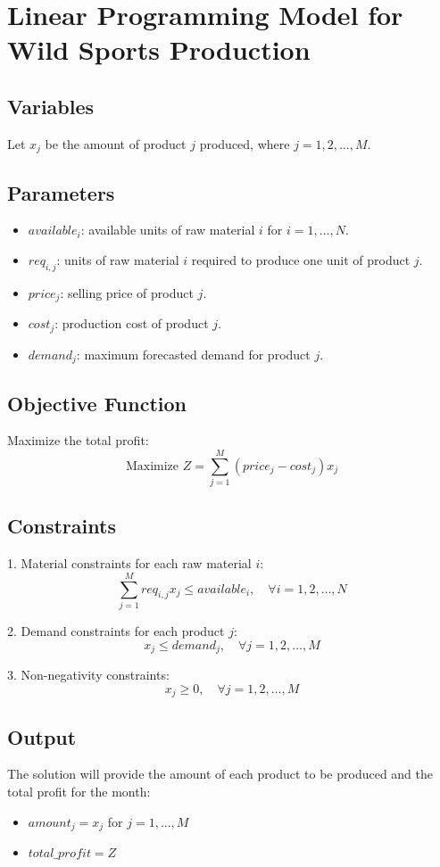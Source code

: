 \documentclass{article}
\begin{document}
\section*{Linear Programming Model for Wild Sports Production}

\subsection*{Variables}
Let \( x_j \) be the amount of product \( j \) produced, where \( j = 1, 2, \ldots, M \).

\subsection*{Parameters}
\begin{itemize}
    \item \( available_i \): available units of raw material \( i \) for \( i = 1, \ldots, N \).
    \item \( req_{i,j} \): units of raw material \( i \) required to produce one unit of product \( j \).
    \item \( price_j \): selling price of product \( j \).
    \item \( cost_j \): production cost of product \( j \).
    \item \( demand_j \): maximum forecasted demand for product \( j \).
\end{itemize}

\subsection*{Objective Function}
Maximize the total profit:
\[
\text{Maximize } Z = \sum_{j=1}^{M} (price_j - cost_j) x_j
\]

\subsection*{Constraints}
1. Material constraints for each raw material \( i \):
\[
\sum_{j=1}^{M} req_{i,j} x_j \leq available_i, \quad \forall i = 1, 2, \ldots, N
\]

2. Demand constraints for each product \( j \):
\[
x_j \leq demand_j, \quad \forall j = 1, 2, \ldots, M
\]

3. Non-negativity constraints:
\[
x_j \geq 0, \quad \forall j = 1, 2, \ldots, M
\]

\subsection*{Output}
The solution will provide the amount of each product to be produced and the total profit for the month:
\begin{itemize}
    \item \( amount_j = x_j \) for \( j = 1, \ldots, M \)
    \item \( total\_profit = Z \)
\end{itemize}
\end{document}
